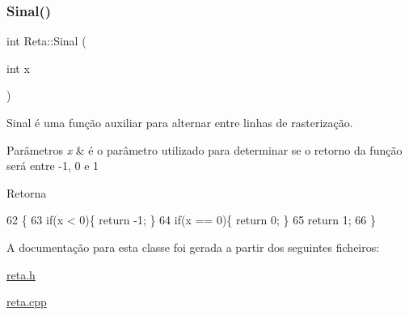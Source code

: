 \subsubsection{\texorpdfstring{Sinal()}{Sinal()}}
{\footnotesize\ttfamily int Reta\+::\+Sinal (\begin{DoxyParamCaption}\item[{int}]{x }\end{DoxyParamCaption})}



Sinal é uma função auxiliar para alternar entre linhas de rasterização. 


\begin{DoxyParams}{Parâmetros}
{\em x} & é o parâmetro utilizado para determinar se o retorno da função será entre -\/1, 0 e 1 \\
\hline
\end{DoxyParams}
\begin{DoxyReturn}{Retorna}

\end{DoxyReturn}

\begin{DoxyCode}
62 \{
63     \textcolor{keywordflow}{if}(x < 0)\{ \textcolor{keywordflow}{return} -1; \}
64     \textcolor{keywordflow}{if}(x == 0)\{ \textcolor{keywordflow}{return} 0; \}
65     \textcolor{keywordflow}{return} 1;
66 \}
\end{DoxyCode}


A documentação para esta classe foi gerada a partir dos seguintes ficheiros\+:\begin{DoxyCompactItemize}
\item 
\hyperlink{reta_8h}{reta.\+h}\item 
\hyperlink{reta_8cpp}{reta.\+cpp}\end{DoxyCompactItemize}
